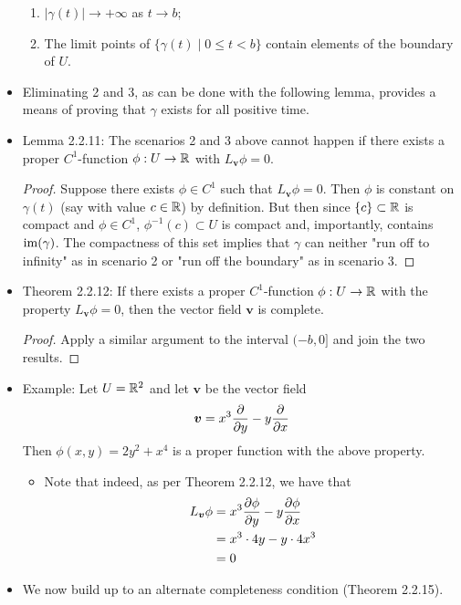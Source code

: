 \documentclass[../notes.tex]{subfiles}
\begin{document}
\begin{itemize}
\begin{enumerate}
        \item $|\gamma(t)|\to +\infty$ as $t\to b$;
        \item The limit points of $\{\gamma(t)\mid 0\leq t<b\}$ contain elements of the boundary of $U$.
    \end{enumerate}
    \item Eliminating 2 and 3, as can be done with the following lemma, provides a means of proving that $\gamma$ exists for all positive time.
    \item Lemma 2.2.11: The scenarios 2 and 3 above cannot happen if there exists a proper $C^1$-function $\phi:U\to\mathbb{R}$ with $L_{\bm{v}}\phi=0$.
    \begin{proof}
        Suppose there exists $\phi\in C^1$ such that $L_{\bm{v}}\phi=0$. Then $\phi$ is constant on $\gamma(t)$ (say with value $c\in\mathbb{R}$) by definition. But then since $\{c\}\subset\mathbb{R}$ is compact and $\phi\in C^1$, $\phi^{-1}(c)\subset U$ is compact and, importantly, contains $\operatorname{im}(\gamma)$. The compactness of this set implies that $\gamma$ can neither "run off to infinity" as in scenario 2 or "run off the boundary" as in scenario 3.
    \end{proof}
    \item Theorem 2.2.12: If there exists a proper $C^1$-function $\phi:U\to\mathbb{R}$ with the property $L_{\bm{v}}\phi=0$, then the vector field $\bm{v}$ is complete.
    \begin{proof}
        Apply a similar argument to the interval $(-b,0]$ and join the two results.
    \end{proof}
    \item Example: Let $U=\mathbb{R}^2$ and let $\bm{v}$ be the vector field
    \begin{equation*}
        \bm{v} = x^3\pdv{y}-y\pdv{x}
    \end{equation*}
    Then $\phi(x,y)=2y^2+x^4$ is a proper function with the above property.
    \begin{itemize}
        \item Note that indeed, as per Theorem 2.2.12, we have that
        \begin{align*}
            L_{\bm{v}}\phi &= x^3\pdv{\phi}{y}-y\pdv{\phi}{x}\\
            &= x^3\cdot 4y-y\cdot 4x^3\\
            &= 0
        \end{align*}
    \end{itemize}
    \item We now build up to an alternate completeness condition (Theorem 2.2.15).

\end{itemize}
\end{document}
